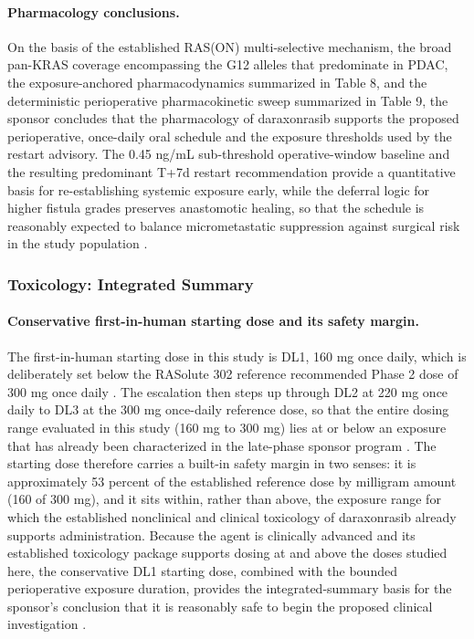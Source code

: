 
\paragraph{Pharmacology conclusions.}
On the basis of the established RAS(ON) multi-selective mechanism, the broad
pan-KRAS coverage encompassing the G12 alleles that predominate in PDAC, the
exposure-anchored pharmacodynamics summarized in Table 8, and the deterministic
perioperative pharmacokinetic sweep summarized in Table 9, the sponsor concludes
that the pharmacology of daraxonrasib supports the proposed perioperative,
once-daily oral schedule and the exposure thresholds used by the restart
advisory. The 0.45 ng/mL sub-threshold operative-window baseline and the
resulting predominant T+7d restart recommendation provide a quantitative basis
for re-establishing systemic exposure early, while the deferral logic for higher
fistula grades preserves anastomotic healing, so that the schedule is reasonably
expected to balance micrometastatic suppression against surgical risk in the
study population \cite{onpremwhippl,qspmetpancre}.

\subsubsection{Toxicology: Integrated Summary}

\paragraph{Conservative first-in-human starting dose and its safety margin.}
The first-in-human starting dose in this study is DL1, 160 mg once daily, which
is deliberately set below the RASolute 302 reference recommended Phase 2 dose of
300 mg once daily \cite{daraxwhipple}. The escalation then steps up through DL2
at 220 mg once daily to DL3 at the 300 mg once-daily reference dose, so that the
entire dosing range evaluated in this study (160 mg to 300 mg) lies at or below
an exposure that has already been characterized in the late-phase sponsor
program \cite{daraxwhipple,onpremwhippl}. The starting dose therefore carries a
built-in safety margin in two senses: it is approximately 53 percent of the
established reference dose by milligram amount (160 of 300 mg), and it sits
within, rather than above, the exposure range for which the established
nonclinical and clinical toxicology of daraxonrasib already supports
administration. Because the agent is clinically advanced and its established
toxicology package supports dosing at and above the doses studied here, the
conservative DL1 starting dose, combined with the bounded perioperative exposure
duration, provides the integrated-summary basis for the sponsor's conclusion that
it is reasonably safe to begin the proposed clinical investigation
\cite{phase1guidance,daraxwhipple}.

